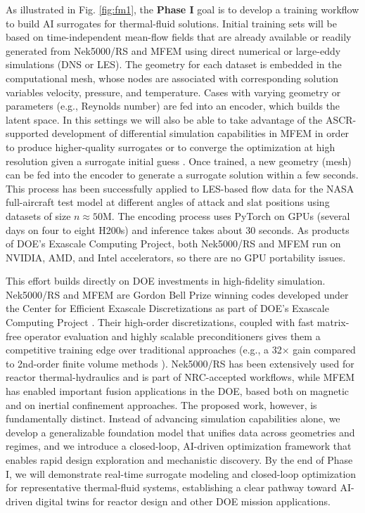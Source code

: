 As illustrated in Fig. \ref{fig:fm1}, the {\bf Phase I} goal is to develop a training
workflow to build AI surrogates for thermal-fluid solutions.   Initial
training sets will be based on time-independent {mean-flow} fields that are already
available or readily generated from Nek5000/RS and MFEM using direct numerical
or large-eddy simulations (DNS or LES).  The geometry for each dataset is embedded
in the computational mesh, whose nodes are associated with corresponding
solution variables velocity, pressure, and temperature.   Cases with
varying geometry or parameters (e.g., Reynolds number) are fed into an
encoder, which builds the latent space. In this settings we will also be able to
take advantage of the ASCR-supported development of differential simulation
capabilities in MFEM in order to produce higher-quality surrogates or to
converge the optimization at high resolution given a surrogate initial guess
\cite{MFEM24, DMC24, Schmidt26}. Once trained, a new geometry (mesh)
can be fed into the encoder to generate a surrogate solution within a few
seconds.  This process has been successfully applied to LES-based flow data
for the NASA full-aircraft test model at different angles of attack and slat
positions using datasets of size $n \approx 50$M.
The encoding process uses PyTorch on GPUs (several days on four to eight H200s)
and inference takes about 30 seconds.  As products of DOE's Exascale Computing
Project, both Nek5000/RS and MFEM run on NVIDIA, AMD, and Intel accelerators,
so there are no GPU portability issues.

This effort builds directly on DOE investments in high-fidelity simulation.
Nek5000/RS and MFEM are Gordon Bell Prize winning codes
\cite{tufo99a,gb23,gb25mfem} developed under the Center for Efficient Exascale
Discretizations as part of DOE's Exascale Computing Project \cite{ceed}.  Their high-order
discretizations, coupled with fast matrix-free operator evaluation and highly
scalable preconditioners gives them a competitive training edge over
traditional approaches (e.g., a 32$\times$ gain compared to 2nd-order finite volume
methods \cite{Min2024Wind,Tomboulides2024ABL}).  Nek5000/RS has been
extensively used for reactor thermal-hydraulics and is part of NRC-accepted
workflows, while MFEM has enabled important fusion applications in the DOE, based both
on magnetic and on inertial confinement approaches.
The proposed work, however, is fundamentally distinct.
Instead of advancing simulation capabilities alone, we develop a generalizable
foundation model that unifies data across geometries and regimes, and we
introduce a closed-loop, AI-driven optimization framework that enables rapid
design exploration and mechanistic discovery. By the end of Phase I, we will
demonstrate real-time surrogate modeling and closed-loop optimization for
representative thermal-fluid systems, establishing a clear pathway toward
AI-driven digital twins for reactor design and other DOE mission applications.


